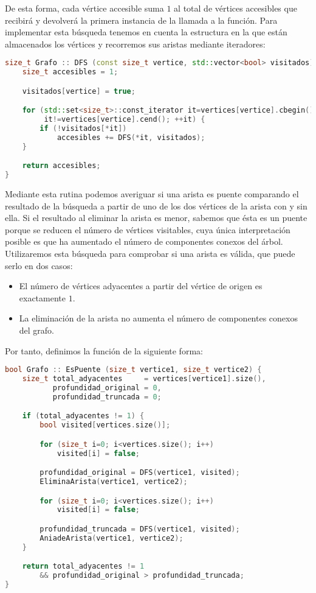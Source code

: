 De esta forma, cada vértice accesible suma $1$ al total de vértices accesibles que recibirá y devolverá la primera instancia de la llamada a la función.
Para implementar esta búsqueda tenemos en cuenta la estructura en la que están almacenados los vértices y recorremos sus aristas mediante iteradores:

\begin{lstlisting}[language=C++]
size_t Grafo :: DFS (const size_t vertice, std::vector<bool> visitados) {
	size_t accesibles = 1;

	visitados[vertice] = true;

	for (std::set<size_t>::const_iterator it=vertices[vertice].cbegin();
	     it!=vertices[vertice].cend(); ++it) {
		if (!visitados[*it])
			accesibles += DFS(*it, visitados);
	}

	return accesibles;
}
\end{lstlisting}

Mediante esta rutina podemos averiguar si una arista es puente comparando el resultado de la búsqueda a partir de uno de los dos vértices de la arista con y sin ella.
Si el resultado al eliminar la arista es menor, sabemos que ésta es un puente porque se reducen el número de vértices visitables, cuya única interpretación posible es que ha aumentado el número de componentes conexos del árbol.
Utilizaremos esta búsqueda para comprobar si una arista es válida, que puede serlo en dos casos:

\begin{itemize}
	\item El número de vértices adyacentes a partir del vértice de origen es exactamente $1$.
	\item La eliminación de la arista no aumenta el número de componentes conexos del grafo.
\end{itemize}

Por tanto, definimos la función  de la siguiente forma:

\begin{lstlisting}[language=C++]
bool Grafo :: EsPuente (size_t vertice1, size_t vertice2) {
	size_t total_adyacentes     = vertices[vertice1].size(),
	       profundidad_original = 0,
	       profundidad_truncada = 0;

	if (total_adyacentes != 1) {
		bool visited[vertices.size()];

		for (size_t i=0; i<vertices.size(); i++)
			visited[i] = false;

		profundidad_original = DFS(vertice1, visited);
		EliminaArista(vertice1, vertice2);

		for (size_t i=0; i<vertices.size(); i++)
			visited[i] = false;

		profundidad_truncada = DFS(vertice1, visited);
		AniadeArista(vertice1, vertice2);
	}

	return total_adyacentes != 1
	    && profundidad_original > profundidad_truncada;
}
\end{lstlisting}

